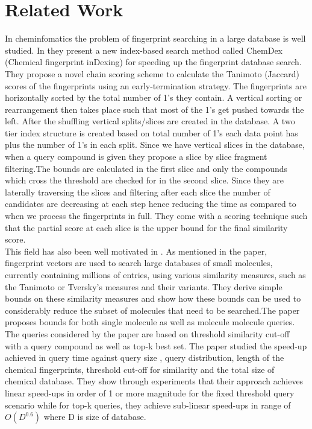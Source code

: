 
\section{Related Work}
In cheminfomatics the problem of fingerprint searching in a large database is well studied. In \citet*{aung2010indexing} they present a new index-based search method called ChemDex (Chemical fingerprint inDexing) for speeding up the fingerprint database search. They propose a novel chain scoring scheme to calculate the Tanimoto (Jaccard) scores of the fingerprints using an early-termination strategy. The fingerprints are horizontally sorted by the total number of 1's they contain. A vertical sorting or rearrangement then takes place such that most of the 1's get pushed towards the left. After the shuffling vertical splits/slices are created in the database. A two tier index structure is created based on total number of 1's each data point has plus the number of 1's in each split. Since we have vertical slices in the database, when a query compound is given they propose a slice by slice fragment filtering.The bounds are calculated in the first slice and only the compounds which cross the threshold are checked for in the second slice. Since they are laterally traversing the slices and filtering after each slice the number of candidates are decreasing at each step hence reducing the time as compared to when we process the fingerprints in full. They come with a scoring technique such that the partial score at each slice is the upper bound for the final similarity score.\\

This field has also been well motivated in \citet*{swamidass2007bounds}. As mentioned in the paper, fingerprint vectors are used to search large databases of small molecules, currently containing millions of entries, using various similarity measures, such as the Tanimoto or Tversky's measures and their variants. They derive simple bounds on these similarity measures and show how these bounds can be used to considerably reduce the subset of molecules that need to be searched.The paper proposes bounds for both single molecule as well as molecule molecule queries. The queries considered by the paper are based on threshold similarity cut-off with a query compound as well as top-k best set. The paper studied the speed-up achieved in query time against query size , query distribution, length of the chemical fingerprints, threshold cut-off for similarity and the total size of chemical database. They show through experiments that their approach achieves linear speed-ups in order of 1 or more magnitude for the fixed threshold query scenario while for top-k queries, they achieve sub-linear speed-ups in range of $O(D^{0.6})$ where D is size of database.\\

